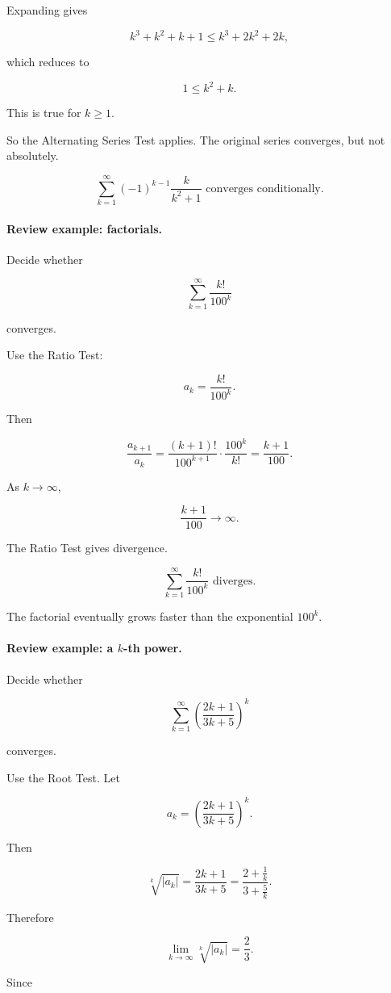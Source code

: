 Expanding gives

\[
k^3+k^2+k+1\le k^3+2k^2+2k,
\]

which reduces to

\[
1\le k^2+k.
\]

This is true for \(k\ge1\).

So the Alternating Series Test applies.  The original series converges, but not
absolutely.

\[
\boxed{
\sum_{k=1}^{\infty}(-1)^{k-1}\frac{k}{k^2+1}
\text{ converges conditionally.}
}
\]

\paragraph{Review example: factorials.}
Decide whether

\[
\sum_{k=1}^{\infty}\frac{k!}{100^k}
\]

converges.

Use the Ratio Test:

\[
a_k=\frac{k!}{100^k}.
\]

Then

\[
\frac{a_{k+1}}{a_k}
=
\frac{(k+1)!}{100^{k+1}}\cdot\frac{100^k}{k!}
=
\frac{k+1}{100}.
\]

As \(k\to\infty\),

\[
\frac{k+1}{100}\to\infty.
\]

The Ratio Test gives divergence.

\[
\boxed{
\sum_{k=1}^{\infty}\frac{k!}{100^k}
\text{ diverges.}
}
\]

The factorial eventually grows faster than the exponential \(100^k\).

\paragraph{Review example: a \(k\)-th power.}
Decide whether

\[
\sum_{k=1}^{\infty}
\left(\frac{2k+1}{3k+5}\right)^k
\]

converges.

Use the Root Test.  Let

\[
a_k=
\left(\frac{2k+1}{3k+5}\right)^k.
\]

Then

\[
\sqrt[k]{|a_k|}
=
\frac{2k+1}{3k+5}
=
\frac{2+\frac1k}{3+\frac5k}.
\]

Therefore

\[
\lim_{k\to\infty}\sqrt[k]{|a_k|}
=
\frac23.
\]

Since

